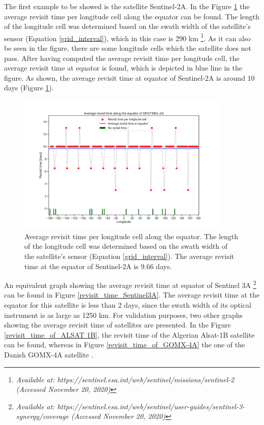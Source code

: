 The first example to be showed is the satellite Sentinel-2A. In the Figure \ref{revisit_time_Sentinel2A} the average revisit time per longitude cell along the equator can be found. The length of the longitude cell was determined based on the swath width of the satellite's sensor (Equation \ref{grid_interval}), which in this case is 290 km \footnote{\label{Sentinel-2}\textit{Available at: https://sentinel.esa.int/web/sentinel/missions/sentinel-2 (Accessed November 20, 2020)}}. As it can also be seen in the figure, there are some longitude cells which the satellite does not pass. After having computed the average revisit time per longitude cell, the average revisit time at equator is found, which is depicted in blue line in the figure. As shown, the average revisit time at equator of Sentinel-2A is around 10 days (Figure \ref{revisit_time_Sentinel2A}).

\begin{figure}
\centering
\includegraphics[width=0.9\textwidth]{Images/revisit_time_of_SENTINEL-2A.png}\caption{Average revisit time per longitude cell along the equator. The length of the longitude cell was determined based on the swath width of the satellite's sensor (Equation \ref{grid_interval}). The average revisit time at the equator of Sentinel-2A is 9.66 days.}
\label{revisit_time_Sentinel2A}
\end{figure}

An equivalent graph showing the average revisit time at equator of Sentinel 3A \footnote{\label{Sentinel3A_source}\textit{Available at: https://sentinel.esa.int/web/sentinel/user-guides/sentinel-3-synergy/coverage (Accessed November 20, 2020)}} can be found in Figure \ref{revisit_time_Sentinel3A}. The average revisit time at the equator for this satellite is less than 2 days, since the swath width of its optical instrument is as large as 1250 km. For validation purposes, two other graphs showing the average revisit time of satellites are presented. In the Figure \ref{revisit_time_of_ALSAT 1B}, the revisit time of the Algerian Alsat-1B satellite can be found, whereas in Figure \ref{revisit_time_of_GOMX-4A} the one of the Danish GOMX-4A satellite \cite{Christopherson}.

